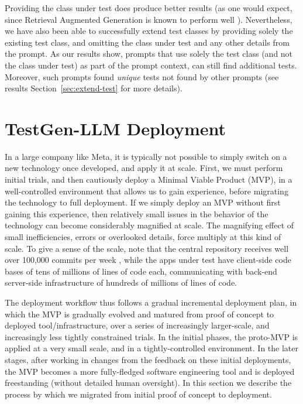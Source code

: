 \documentclass[sigconf,screen]{acmart}
\begin{document}
Providing the class under test does produce better results (as one would expect, since Retrieval Augmented Generation is known to perform well \cite{mhetal:LLM-survey}). 
Nevertheless, we have also been able to successfully extend test classes by providing solely the existing test class, and omitting the class under test and any other details from the prompt.
As our results show, prompts that use solely the test class (and not the class under test) as part of the prompt context, 
can still find additional tests.
Moreover, such prompts found {\em unique} tests not found by other prompts
(see results Section~\ref{sec:extend-test} for more details).










\section{TestGen-LLM Deployment}
In a large company like Meta, it is typically not possible to simply switch on a new technology once developed, and apply it at scale.
First, we must perform initial trials, and then cautiously deploy a Minimal Viable Product (MVP), 
in a well-controlled environment that allows us to gain experience,
before migrating the technology to full deployment.
If we simply deploy an MVP without first gaining this experience, 
then  relatively small issues in the behavior of the technology can become considerably magnified at scale. 
The magnifying effect of small inefficiencies, errors or overlooked details, force multiply at this kind of scale.
To give a sense of the scale, note that the central repository receives well over 100,000 commits per week \cite{mhpoh:scam18-keynote},
while the apps under test have client-side code bases of tens of millions of lines of code each, communicating with back-end server-side infrastructure of hundreds of millions of lines of code.


The deployment workflow thus follows a gradual incremental deployment plan, in which the MVP is gradually evolved and matured from proof of concept to deployed tool/infrastructure, over a series of increasingly larger-scale, and  increasingly less tightly constrained trials.
In the initial phases, the proto-MVP is applied at a very small scale, and in a tightly-controlled environment. 
In the later stages, after working in changes from the feedback on these initial deployments, the MVP becomes a more fully-fledged software engineering tool and is deployed freestanding (without detailed human oversight).
In this section we describe the process by which we migrated from initial proof of concept to deployment.
\end{document}

